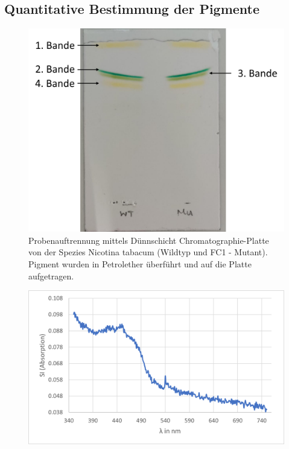 \documentclass[10pt,a4paper]{article}
\begin{document}
		\subsection{Quantitative Bestimmung der Pigmente}
			
			\begin{figure}[H]
				\centering
				\includegraphics[scale=0.65]{DC-Plate_with_label.png}
				\caption{Probenauftrennung mittels Dünnschicht Chromatographie-Platte von der Spezies Nicotina tabacum (Wildtyp und FC1 - Mutant). Pigment wurden in Petrolether überführt und auf die Platte aufgetragen.}
				\label{fig:DC_Platte}
			\end{figure}
	
			\begin{figure}[H]
				\centering
				\includegraphics[scale=1]{firstband_axischange.png}
				\caption{}
				\label{fig:erste Bande}
			\end{figure}
			
\end{document}
